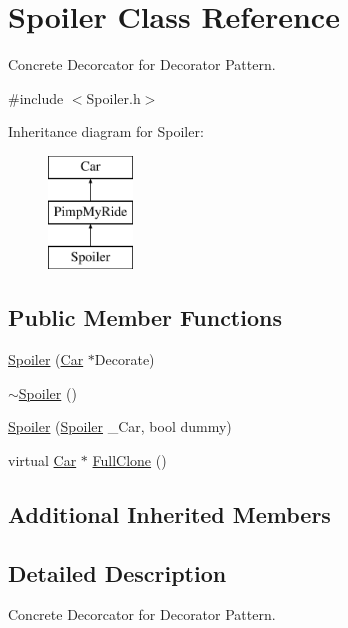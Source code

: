 \hypertarget{class_spoiler}{}\section{Spoiler Class Reference}
\label{class_spoiler}


Concrete Decorcator for Decorator Pattern.  




{\ttfamily \#include $<$Spoiler.\+h$>$}

Inheritance diagram for Spoiler\+:\begin{figure}[H]
\begin{center}
\leavevmode
\includegraphics[height=3.000000cm]{class_spoiler}
\end{center}
\end{figure}
\subsection*{Public Member Functions}
\begin{DoxyCompactItemize}
\item 
\mbox{\hyperlink{class_spoiler_a2cae3e69c5e246b4332c7718a7b381ba}{Spoiler}} (\mbox{\hyperlink{class_car}{Car}} $\ast$Decorate)
\item 
\mbox{\hyperlink{class_spoiler_a0f1d8a66634330aef2a2e8d99360945e}{$\sim$\+Spoiler}} ()
\item 
\mbox{\hyperlink{class_spoiler_a6fbdbdf1a4ff3c894f74712bd0f118a8}{Spoiler}} (\mbox{\hyperlink{class_spoiler}{Spoiler}} \+\_\+\+Car, bool dummy)
\item 
virtual \mbox{\hyperlink{class_car}{Car}} $\ast$ \mbox{\hyperlink{class_spoiler_a240c57673fae69ffa9cf51468ca17793}{Full\+Clone}} ()
\end{DoxyCompactItemize}
\subsection*{Additional Inherited Members}


\subsection{Detailed Description}
Concrete Decorcator for Decorator Pattern. 


